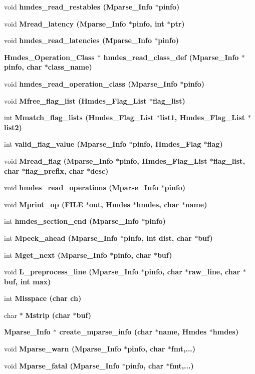 \begin{CompactItemize}
\item 
void \bf{hmdes\_\-read\_\-restables} (\bf{Mparse\_\-Info} $\ast$pinfo)
\item 
void \bf{Mread\_\-latency} (\bf{Mparse\_\-Info} $\ast$pinfo, int $\ast$ptr)
\item 
void \bf{hmdes\_\-read\_\-latencies} (\bf{Mparse\_\-Info} $\ast$pinfo)
\item 
\bf{Hmdes\_\-Operation\_\-Class} $\ast$ \bf{hmdes\_\-read\_\-class\_\-def} (\bf{Mparse\_\-Info} $\ast$pinfo, char $\ast$class\_\-name)
\item 
void \bf{hmdes\_\-read\_\-operation\_\-class} (\bf{Mparse\_\-Info} $\ast$pinfo)
\item 
void \bf{Mfree\_\-flag\_\-list} (\bf{Hmdes\_\-Flag\_\-List} $\ast$flag\_\-list)
\item 
int \bf{Mmatch\_\-flag\_\-lists} (\bf{Hmdes\_\-Flag\_\-List} $\ast$list1, \bf{Hmdes\_\-Flag\_\-List} $\ast$list2)
\item 
int \bf{valid\_\-flag\_\-value} (\bf{Mparse\_\-Info} $\ast$pinfo, \bf{Hmdes\_\-Flag} $\ast$flag)
\item 
void \bf{Mread\_\-flag} (\bf{Mparse\_\-Info} $\ast$pinfo, \bf{Hmdes\_\-Flag\_\-List} $\ast$flag\_\-list, char $\ast$flag\_\-prefix, char $\ast$desc)
\item 
void \bf{hmdes\_\-read\_\-operations} (\bf{Mparse\_\-Info} $\ast$pinfo)
\item 
void \bf{Mprint\_\-op} (FILE $\ast$out, \bf{Hmdes} $\ast$hmdes, char $\ast$\bf{name})
\item 
int \bf{hmdes\_\-section\_\-end} (\bf{Mparse\_\-Info} $\ast$pinfo)
\item 
int \bf{Mpeek\_\-ahead} (\bf{Mparse\_\-Info} $\ast$pinfo, int dist, char $\ast$buf)
\item 
int \bf{Mget\_\-next} (\bf{Mparse\_\-Info} $\ast$pinfo, char $\ast$buf)
\item 
void \bf{L\_\-preprocess\_\-line} (\bf{Mparse\_\-Info} $\ast$pinfo, char $\ast$raw\_\-line, char $\ast$buf, int max)
\item 
int \bf{Misspace} (char ch)
\item 
char $\ast$ \bf{Mstrip} (char $\ast$buf)
\item 
\bf{Mparse\_\-Info} $\ast$ \bf{create\_\-mparse\_\-info} (char $\ast$\bf{name}, \bf{Hmdes} $\ast$hmdes)
\item 
void \bf{Mparse\_\-warn} (\bf{Mparse\_\-Info} $\ast$pinfo, char $\ast$fmt,...)
\item 
void \bf{Mparse\_\-fatal} (\bf{Mparse\_\-Info} $\ast$pinfo, char $\ast$fmt,...)

\end{CompactItemize}

